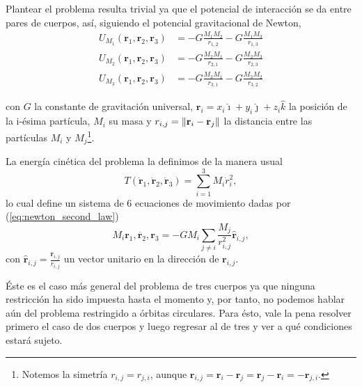 Plantear el problema resulta trivial ya que el potencial de interacción se da entre pares de cuerpos, así, siguiendo el potencial gravitacional de Newton, 
\begin{align}
 U_{M_1}(\mathbf{r}_1,\mathbf{r}_2,\mathbf{r}_3) &= -G \frac{M_1 M_2}{r_{1,2}} - G \frac{M_1 M_3}{r_{1,3}} \\
 U_{M_2}(\mathbf{r}_1,\mathbf{r}_2,\mathbf{r}_3) &= -G \frac{M_2 M_1}{r_{2,1}} - G \frac{M_2 M_3}{r_{2,3}} \\
 U_{M_3}(\mathbf{r}_1,\mathbf{r}_2,\mathbf{r}_3) &= -G \frac{M_3 M_1}{r_{3,1}} - G \frac{M_3 M_2}{r_{3,2}}
 \label{eq:3body_potential}
\end{align}

con $G$ la constante de gravitación universal, $\mathbf{r}_i = x_i \hat{\imath} + y_i \hat{\jmath} + z_i \hat{k}$ la posición de la i-ésima partícula, $M_i$ su masa y $r_{i,j} = \left\lVert \mathbf{r}_i - \mathbf{r}_j\right\rVert$ la distancia entre las partículas $M_i$ y $M_j$\footnote{Notemos la simetría $r_{i,j} = r_{j,i}$, aunque $\mathbf{r}_{i,j} = \mathbf{r}_i - \mathbf{r}_j = \mathbf{r}_j - \mathbf{r}_i  = - \mathbf{r}_{j,i}$.}. 

La energía cinética del problema la definimos de la manera usual 
\begin{equation}
 T(\dot{\mathbf{r}}_1,\dot{\mathbf{r}}_2,\dot{\mathbf{r}}_3) = \sum_{i=1}^3 M_i \dot{r}_i^2,
 \label{eq:3body_cinetic}
\end{equation}
lo cual define un sistema de 6 ecuaciones de movimiento dadas por (\ref{eq:newton_second_law})
\begin{equation}
 M_i \ddot{\mathbf{r}_1,\mathbf{r}_2,\mathbf{r}_3} = - G M_i \sum_{j\neq i} \frac{M_j}{r_{i,j}^2} \hat{\mathbf{r}}_{i,j},
 \label{eq:3body_eqs_motion}
\end{equation}
con $\hat{\mathbf{r}}_{i,j} = \frac{\mathbf{r}_{i,j}}{r_{i,j}}$ un vector unitario en la dirección de $\mathbf{r}_{i,j}$.

Éste es el caso más general del problema de tres cuerpos ya que ninguna restricción ha sido impuesta hasta el momento y, por tanto, no podemos hablar aún del problema restringido a órbitas circulares. Para ésto, vale la pena resolver primero el caso de dos cuerpos y luego regresar al de tres y ver a qué condiciones estará sujeto. 

